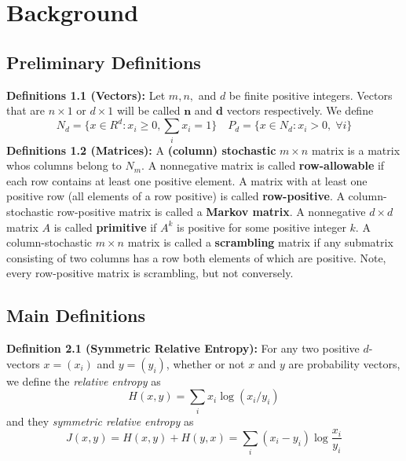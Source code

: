 \section{Background}
\subsection*{Preliminary Definitions}
\noindent\textbf{Definitions 1.1 (Vectors):} Let $m,n,$ and $d$ be finite positive integers. Vectors that are $n \times 1$ or $d \times 1$ will be called $\mathbf{n}$ and $\mathbf{d}$ vectors respectively. We define 
\[N_d = \{x \in R^d : x_i \geq 0, \sum_i x_i = 1\} \quad P_d = \{x \in N_d : x_i > 0, \; \forall i\}\]
\noindent\textbf{Definitions 1.2 (Matrices):} A \textbf{(column) stochastic} $m \times n$ matrix is a matrix whos columns belong to $N_m$. A nonnegative matrix is called \textbf{row-allowable} if each row contains at least one positive element. A matrix with at least one positive row (all elements of a row positive) is called \textbf{row-positive}. A column-stochastic row-positive matrix is called a \textbf{Markov matrix}. A nonnegative $d \times d$ matrix $A$ is called \textbf{primitive} if $A^k$ is positive for some positive integer $k$. A column-stochastic $m \times n$ matrix is called a \textbf{scrambling} matrix if any submatrix consisting of two columns has a row both elements of which are positive. Note, every row-positive matrix is scrambling, but not conversely.


\subsection*{Main Definitions}\label{sssec:def2.1}
\noindent\textbf{Definition 2.1 (Symmetric Relative Entropy):} For any two positive $d$-vectors $x = (x_i)$ and $y = (y_i)$, whether or not $x$ and $y$ are probability vectors, we define the \textit{relative entropy} as \[H(x,y) = \sum_i x_i \log(x_i/y_i)\]
and they \textit{symmetric relative entropy} as 
\[J(x,y) = H(x,y) + H(y, x) = \sum_i (x_i - y_i) \log \frac{x_i}{y_i}\]
